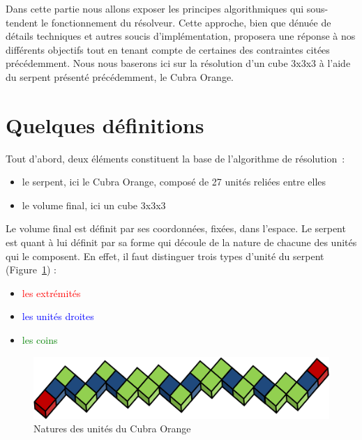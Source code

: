 Dans cette partie nous allons exposer les principes algorithmiques qui sous-tendent le fonctionnement du résolveur. Cette approche, bien que dénuée de détails techniques et autres soucis d’implémentation, proposera une réponse à nos différents objectifs tout en tenant compte de certaines des contraintes citées précédemment.  Nous nous baserons ici sur la résolution d’un cube 3x3x3 à l’aide du serpent présenté précédemment, le Cubra Orange.

\section{Quelques définitions}

Tout d’abord, deux éléments constituent la base de l’algorithme de résolution :\newline

\begin{itemize}
 \item le serpent, ici le Cubra Orange, composé de 27 unités reliées entre elles
 \item le volume final, ici un cube 3x3x3
\end{itemize}

\vspace{0.5cm}

Le volume final est définit par ses coordonnées, fixées, dans l’espace. Le serpent est quant à lui définit par sa forme qui découle de la nature de chacune des unités qui le composent. En effet, il faut distinguer trois types d’unité du serpent (Figure~\ref{snakeUnits}) :\newline

\begin{itemize}
 \item \textcolor{red}{les extrémités}
 \item \textcolor{blue}{les unités droites}
 \item \textcolor{green}{les coins}
\end{itemize}

\begin{figure}[h]
 \centering
 \includegraphics[scale=0.5,keepaspectratio=true]{img/unitTypes.png}
 \caption{Natures des unités du Cubra Orange}
 \label{snakeUnits}
\end{figure}

